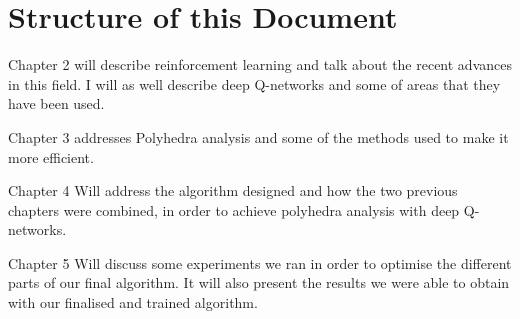 \section{Structure of this Document}

Chapter 2 will describe reinforcement learning and talk about the recent advances in this field. I will as well describe deep Q-networks and some of areas that they have been used.

Chapter 3 addresses Polyhedra analysis and some of the methods used to make it more efficient. 

Chapter 4 Will address the algorithm designed and how the two previous chapters were combined, in order to achieve polyhedra analysis with deep Q-networks.

Chapter 5 Will discuss some experiments we ran in order to optimise the different parts of our final algorithm. It will also present the results we were able to obtain with our finalised and trained algorithm.


%
%

